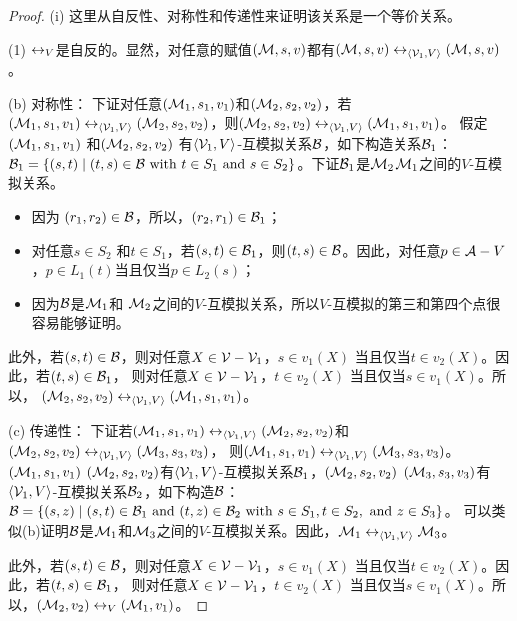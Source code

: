 \begin{proof}
	
	(i) 这里从自反性、对称性和传递性来证明该关系是一个等价关系。
	
	(1) $\leftrightarrow_V$是自反的。显然，对任意的赋值$({\cal M},s,v)$都有$({\cal M},s,v)\leftrightarrow_{{\langle{{\cal V}_1,V}\rangle}} ({\cal M},s,v)$。
	
	(b) 对称性： %
	下证对任意$({\cal M}_1,s_1, v_1)$和$({\cal M}_2,s_2,v_2)$，若$({\cal M}_1,s_1, v_1) \leftrightarrow_{{\langle{{\cal V}_1,V}\rangle}} ({\cal M}_2,s_2,v_2)$，则$({\cal M}_2,s_2, v_2) \leftrightarrow_{{\langle{{\cal V}_1,V}\rangle}} ({\cal M}_1,s_1, v_1)$。
	假定$({\cal M}_1, s_1,v_1)$ 和$({\cal M}_2,s_2,v_2)$ 有${{\langle{{\cal V}_1,V}\rangle}}$-互模拟关系${\cal B}$，如下构造关系${\cal B}_1$：${\cal B}_1=\{(s,t) \mid (t, s)\in {\cal B}\hbox{ with } t\in S_1 \hbox{ and } s\in S_2\}$。下证${\cal B}_1$是${\cal M}_2$${\cal M}_1$之间的$V$-互模拟关系。
	\begin{itemize}
		\item 因为 $(r_1,r_2) \in {\cal B}$，所以，$(r_2,r_1) \in {\cal B}_1$；
		\item 对任意$s\in S_2$ 和$t\in S_1$，若$(s,t) \in {\cal B}_1$，则$(t,s) \in {\cal B}$。因此，对任意$p \in {\cal A} - V$，$p \in L_1(t)$当且仅当$p \in L_2(s)$；
		\item 因为${\cal B}$是${\cal M}_1$和 ${\cal M}_2$之间的$V$-互模拟关系，所以$V$-互模拟的第三和第四个点很容易能够证明。
	\end{itemize}
	此外，若$(s,t) \in {\cal B}$，则对任意$X\in {\cal V} -{\cal V}_1$，$s \in v_1(X)$ 当且仅当$t \in v_2(X)$。因此，若$(t,s) \in {\cal B}_1$， 则对任意$X\in {\cal V} -{\cal V}_1$，$t \in v_2(X)$ 当且仅当$s\in v_1(X)$。所以， $({\cal M}_2,s_2, v_2) \leftrightarrow_{{\langle{{\cal V}_1,V}\rangle}} ({\cal M}_1,s_1, v_1)$。

	(c) 传递性：%
	下证若$({\cal M}_1,s_1,v_1) \leftrightarrow_{{\langle{{\cal V}_1,V}\rangle}} ({\cal M}_2,s_2,v_2)$和$({\cal M}_2,s_2,v_2) \leftrightarrow_{{\langle{{\cal V}_1,V}\rangle}} ({\cal M}_3,s_3,v_3)$， 则$({\cal M}_1,s_1,v_1) \leftrightarrow_{{\langle{{\cal V}_1,V}\rangle}} ({\cal M}_3,s_3,v_3)$。$({\cal M}_1,s_1,v_1)$ $({\cal M}_2,s_2,v_2)$有${{\langle{{\cal V}_1,V}\rangle}}$-互模拟关系${\cal B}_1$，$({\cal M}_2,s_2,v_2)$ $({\cal M}_3,s_3,v_3)$有${{\langle{{\cal V}_1,V}\rangle}}$-互模拟关系${\cal B}_2$，如下构造${\cal B}$：${\cal B}=\{(s, z) \mid (s,t) \in {\cal B}_1\ \mbox{and}\ (t, z)\in {\cal B}_2 \hbox{ with } s\in S_1,  t\in S_2, \hbox{ and } z \in S_3\}$。
	可以类似(b)证明${\cal B}$是${\cal M}_1$和${\cal M}_3$之间的$V$-互模拟关系。因此，${\cal M}_1 \leftrightarrow_{{\langle{{\cal V}_1,V}\rangle}} {\cal M}_3$。
	
	此外，若$(s,t) \in {\cal B}$，则对任意$X\in {\cal V}-{\cal V}_1$，$s \in v_1(X)$ 当且仅当$t \in v_2(X)$。因此，若$(t,s) \in {\cal B}_1$， 则对任意$X\in {\cal V}-{\cal V}_1$，$t \in v_2(X)$ 当且仅当$s\in v_1(X)$。所以，$({\cal M}_2, v_2) \leftrightarrow_V ({\cal M}_1, v_1)$。
	


\end{proof}

